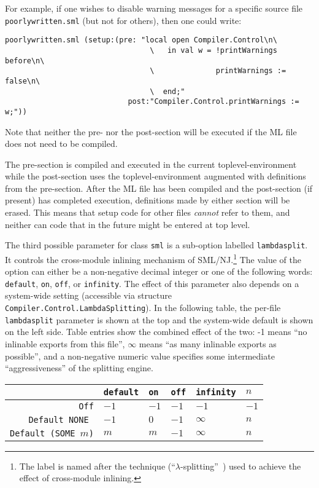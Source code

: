 For example, if one wishes to disable warning messages for a specific
source file {\tt poorlywritten.sml} (but not for others), then one
could write:

\begin{lstlisting}[language=CM]
  poorlywritten.sml (setup:(pre: "local open Compiler.Control\n\
                                 \   in val w = !printWarnings before\n\
                                 \              printWarnings := false\n\
                                 \  end;"
                            post:"Compiler.Control.printWarnings := w;"))
\end{lstlisting}%

\noindent Note that neither the pre- nor the post-section will be
executed if the ML file does not need to be compiled.

The pre-section is compiled and executed in the current
toplevel-environment while the post-section uses the
toplevel-environment augmented with definitions from the pre-section.
After the ML file has been compiled and the post-section (if present)
has completed execution, definitions made by either section will be
erased.  This means that setup code for other files {\em cannot} refer
to them, and neither can code that in the future might be entered at
top level.

The third possible parameter for class {\tt sml} is a
sub-option labelled {\tt lambdasplit}.  It controls the cross-module
inlining mechanism of SML/NJ.\footnote{The label is named after the
technique (``$\lambda$-splitting''~\cite{blume97:lsplit}) used to
achieve the effect of cross-module inlining.}  The value of the option
can either be a non-negative decimal integer or one of the following
words: {\tt default}, {\tt on}, {\tt off}, or {\tt infinity}.  The
effect of this parameter also depends on a system-wide setting
(accessible via structure {\tt Compiler.Control.LambdaSplitting}).
In the following table, the per-file {\tt lambdasplit} parameter is
shown at the top and the system-wide default is shown on the left
side.  Table entries show the combined effect of the two: -1
means ``no inlinable exports from this file'', $\infty$ means
``as many inlinable exports as possible'', and a non-negative numeric
value specifies some intermediate ``aggressiveness'' of the splitting
engine.

\begin{center}
\begin{tabular}{r||l|l|l|l|l}
             & {\tt default} & {\tt on} & {\tt off} & {\tt infinity} & $n$ \\
\hline \hline
{\tt Off}    & $-1$          & $-1$     & $-1$      & $-1$           & $-1$ \\
\hline
{\tt Default NONE } & $-1$   & $0$      & $-1$      & $\infty$       & $n$ \\
\hline
{\tt Default (SOME $m$)} & $m$ & $m$    & $-1$      & $\infty$       & $n$
\end{tabular}
\end{center}

